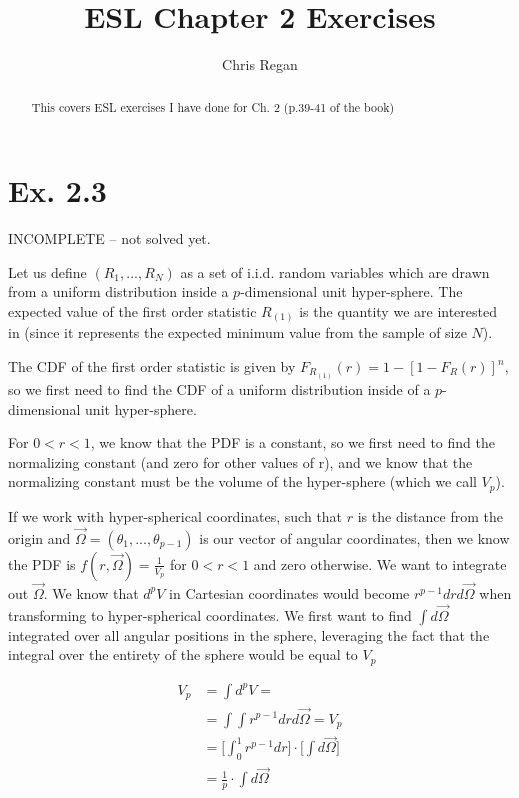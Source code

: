 \documentclass[]{article}
\title{ESL Chapter 2 Exercises}
\author{Chris Regan}
\begin{document}
\maketitle

\begin{abstract}
This covers ESL exercises I have done for Ch. 2 (p.39-41 of the book)
\end{abstract}

\section{Ex. 2.3}

INCOMPLETE -- not solved yet.

Let us define $(R_1, ..., R_N)$ as a set of i.i.d. random variables which are drawn from a uniform distribution inside a $p$-dimensional unit hyper-sphere. The expected value of the first order statistic $R_{(1)}$ is the quantity we are interested in (since it represents the expected minimum value from the sample of size $N$).

The CDF of the first order statistic is given by $F_{R_{(1)}}(r) = 1-[1-F_R(r)]^n$, so we first need to find the CDF of a uniform distribution inside of a $p$-dimensional unit hyper-sphere. 

For $0<r<1$, we know that the PDF is a constant, so we first need to find the normalizing constant (and zero for other values of r), and we know that the normalizing constant must be the volume of the hyper-sphere (which we call $V_p$). 

If we work with hyper-spherical coordinates, such that $r$ is the distance from the origin and $\vec{\Omega}=(\theta_1,...,\theta_{p-1})$ is our vector of angular coordinates, then we know the PDF is $f(r, \vec{\Omega})=\frac{1}{V_p}$ for $0<r<1$ and zero otherwise. We want to integrate out $\vec{\Omega}$. We know that $d^pV$ in Cartesian coordinates would become $r^{p-1}dr d\vec{\Omega}$ when transforming to hyper-spherical coordinates. We first want to find $\int d\vec{\Omega}$ integrated over all angular positions in the sphere, leveraging the fact that the integral over the entirety of the sphere would be equal to $V_p$

\begin{equation}
	\begin{aligned}
		V_p &= \int d^pV= \\
		&=\int \int r^{p-1} dr d\vec{\Omega} = V_p \\
		&=\bigg[\int_0^1 r^{p-1} dr \bigg]\cdot \bigg[\int d \vec{\Omega} \bigg] \\
		&=\frac{1}{p} \cdot \int d \vec{\Omega}
	\end{aligned}
\end{equation}
\end{document}
